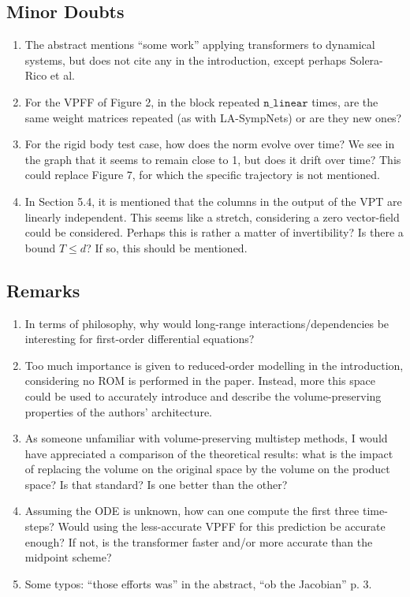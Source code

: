 \documentclass{article}
\begin{document}
\subsection*{Minor Doubts}

\begin{enumerate}
    \item The abstract mentions ``some work'' applying transformers to dynamical systems, but does not cite any in the introduction, except perhaps Solera-Rico et al.
    \item For the VPFF of Figure 2, in the block repeated $\mathtt{n\_linear}$ times, are the same weight matrices repeated (as with LA-SympNets) or are they new ones?
    \item For the rigid body test case, how does the norm evolve over time? We see in the graph that it seems to remain close to 1, but does it drift over time? This could replace Figure 7, for which the specific trajectory is not mentioned.
    \item In Section 5.4, it is mentioned that the columns in the output of the VPT are linearly independent. This seems like a stretch, considering a zero vector-field could be considered. Perhaps this is rather a matter of invertibility? Is there a bound $T\leq{}d$? If so, this should be mentioned.
\end{enumerate}


\subsection*{Remarks}

\begin{enumerate}
    \item In terms of philosophy, why would long-range interactions/dependencies be interesting for first-order differential equations?
    \item Too much importance is given to reduced-order modelling in the introduction, considering no ROM is performed in the paper. Instead, more this space could be used to accurately introduce and describe the volume-preserving properties of the authors' architecture.
    \item As someone unfamiliar with volume-preserving multistep methods, I would have appreciated a comparison of the theoretical results: what is the impact of replacing the volume on the original space by the volume on the product space? Is that standard? Is one better than the other?
    \item Assuming the ODE is unknown, how can one compute the first three time-steps? Would using the less-accurate VPFF for this prediction be accurate enough? If not, is the transformer faster and/or more accurate than the midpoint scheme?
    \item Some typos: ``those efforts was'' in the abstract, ``ob the Jacobian'' p. 3.
\end{enumerate}
\end{document}

